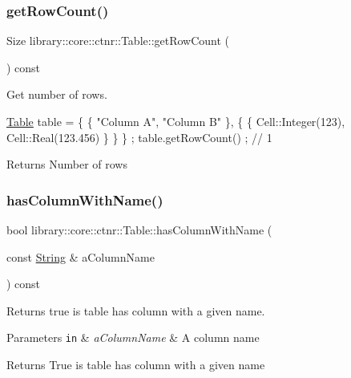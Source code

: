 \subsubsection{\texorpdfstring{get\+Row\+Count()}{getRowCount()}}
{\footnotesize\ttfamily Size library\+::core\+::ctnr\+::\+Table\+::get\+Row\+Count (\begin{DoxyParamCaption}{ }\end{DoxyParamCaption}) const}



Get number of rows. 


\begin{DoxyCode}
\hyperlink{classlibrary_1_1core_1_1ctnr_1_1_table_a5b11121caa4288c3da642af7c6a5a632}{Table} table = \{ \{ \textcolor{stringliteral}{"Column A"}, \textcolor{stringliteral}{"Column B"} \}, \{ \{ Cell::Integer(123), Cell::Real(123.456) \} \} \} ;
table.getRowCount() ; \textcolor{comment}{// 1}
\end{DoxyCode}


\begin{DoxyReturn}{Returns}
Number of rows 
\end{DoxyReturn}
\mbox{\label{classlibrary_1_1core_1_1ctnr_1_1_table_a53d1981ce11ba15cc920addfba23e236}} 
\subsubsection{\texorpdfstring{has\+Column\+With\+Name()}{hasColumnWithName()}}
{\footnotesize\ttfamily bool library\+::core\+::ctnr\+::\+Table\+::has\+Column\+With\+Name (\begin{DoxyParamCaption}\item[{const \hyperlink{classlibrary_1_1core_1_1types_1_1_string}{String} \&}]{a\+Column\+Name }\end{DoxyParamCaption}) const}



Returns true is table has column with a given name. 


\begin{DoxyParams}[1]{Parameters}
\mbox{\tt in}  & {\em a\+Column\+Name} & A column name \\
\hline
\end{DoxyParams}
\begin{DoxyReturn}{Returns}
True is table has column with a given name 
\end{DoxyReturn}
\mbox{\label{classlibrary_1_1core_1_1ctnr_1_1_table_ae0b9f9ee022ed72e06ed41f324855c1a}} 

